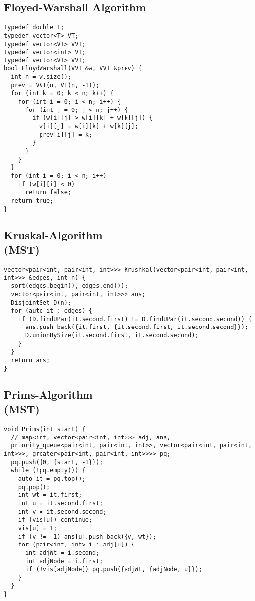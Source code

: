 \documentclass[10pt, a4paper]{article}
\begin{document}
\begin{multicols}{2}
\subsection{Floyed-Warshall Algorithm}
\begin{lstlisting}
typedef double T;
typedef vector<T> VT;
typedef vector<VT> VVT;
typedef vector<int> VI;
typedef vector<VI> VVI;
bool FloydWarshall(VVT &w, VVI &prev) {
  int n = w.size();
  prev = VVI(n, VI(n, -1));
  for (int k = 0; k < n; k++) {
    for (int i = 0; i < n; i++) {
      for (int j = 0; j < n; j++) {
        if (w[i][j] > w[i][k] + w[k][j]) {
          w[i][j] = w[i][k] + w[k][j];
          prev[i][j] = k;
        }
      }
    }
  }
  for (int i = 0; i < n; i++)
    if (w[i][i] < 0)
      return false;
  return true;
}
\end{lstlisting}
\subsection{Kruskal-Algorithm\\(MST)}
\begin{lstlisting}
vector<pair<int, pair<int, int>>> Krushkal(vector<pair<int, pair<int, int>>> &edges, int n) {
  sort(edges.begin(), edges.end());
  vector<pair<int, pair<int, int>>> ans;
  DisjointSet D(n);
  for (auto it : edges) {
    if (D.findUPar(it.second.first) != D.findUPar(it.second.second)) {
      ans.push_back({it.first, {it.second.first, it.second.second}});
      D.unionBySize(it.second.first, it.second.second);
    }
  }
  return ans;
}
\end{lstlisting}
\subsection{Prims-Algorithm\\(MST)}
\begin{lstlisting}
void Prims(int start) {
  // map<int, vector<pair<int, int>>> adj, ans;
  priority_queue<pair<int, pair<int, int>>, vector<pair<int, pair<int, int>>>, greater<pair<int, pair<int, int>>>> pq;
  pq.push({0, {start, -1}});
  while (!pq.empty()) {
    auto it = pq.top();
    pq.pop();
    int wt = it.first;
    int u = it.second.first;
    int v = it.second.second;
    if (vis[u]) continue;
    vis[u] = 1;
    if (v != -1) ans[u].push_back({v, wt});
    for (pair<int, int> i : adj[u]) {
      int adjWt = i.second;
      int adjNode = i.first;
      if (!vis[adjNode]) pq.push({adjWt, {adjNode, u}});
    }
  }
}
\end{lstlisting}

\end{multicols}
\end{document}
